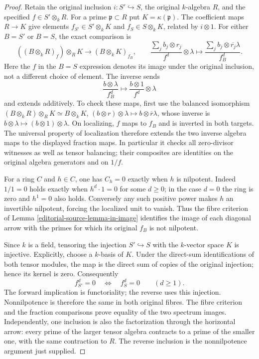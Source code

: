 \begin{proof}
Retain the original inclusion $i:S'\hookrightarrow S$,
the original $k$-algebra $R$, and the specified
$f\in S'\otimes_kR$. For a prime $\mathfrak p\subset R$
put $K=\kappa(\mathfrak p)$. The coefficient maps
$R\to K$ give elements $f_{S'}\in S'\otimes_kK$
and $f_S\in S\otimes_kK$, related by $i\otimes1$.
For either $B=S'$ or $B=S$, the exact comparison is
$$
((B\otimes_kR)_f)\otimes_RK
\longrightarrow (B\otimes_kK)_{f_B},
\qquad
\frac{\sum_j b_j\otimes r_j}{f^d}\otimes\lambda
\longmapsto
\frac{\sum_j b_j\otimes\overline{r_j}\lambda}{f_B^d}.
$$
Here the $f$ in the $B=S$ expression denotes its
image under the original inclusion, not a different
choice of element. The inverse sends
$$
\frac{b\otimes\lambda}{f_B^d}
\longmapsto \frac{b\otimes1}{f^d}\otimes\lambda
$$
and extends additively. To check these maps, first use
the balanced isomorphism
$(B\otimes_kR)\otimes_RK\simeq B\otimes_kK$,
$(b\otimes r)\otimes\lambda\mapsto b\otimes\overline r\lambda$,
whose inverse is $b\otimes\lambda\mapsto(b\otimes1)\otimes\lambda$.
On localizing, $f$ maps to $f_B$ and is inverted in
both targets. The universal property of localization
therefore extends the two inverse algebra maps to
the displayed fraction maps. In particular it checks
all zero-divisor witnesses as well as tensor balancing;
their composites are identities on the original
algebra generators and on $1/f$.

For a ring $C$ and $h\in C$, one has $C_h=0$
exactly when $h$ is nilpotent. Indeed $1/1=0$
holds exactly when $h^d\cdot1=0$ for some
$d\geq0$; in the case $d=0$ the ring is zero
and $h^1=0$ also holds. Conversely any such positive
power makes $h$ an invertible nilpotent, forcing the
localized unit to vanish. Thus the fibre criterion
of Lemma \ref{editorial-source-lemma-in-image} identifies the image
of each diagonal arrow with the primes for which
its original $f_B$ is not nilpotent.

Since $k$ is a field, tensoring the injection
$S'\hookrightarrow S$ with the $k$-vector space $K$
is injective. Explicitly, choose a $k$-basis of $K$.
Under the direct-sum identifications of both tensor
modules, the map is the direct sum of copies of the
original injection; hence its kernel is zero.
Consequently
$$
f_{S'}^d=0\quad\Longleftrightarrow\quad f_S^d=0
\qquad(d\geq1).
$$
The forward implication is functoriality; the reverse
uses this injection. Nonnilpotence is therefore the
same in both original fibres. The fibre criterion
and the fraction comparisons prove equality of the
two spectrum images. Independently, one inclusion
is also the factorization through the horizontal
arrow: every prime of the larger tensor algebra
contracts to a prime of the smaller one, with the
same contraction to $R$. The reverse inclusion is
the nonnilpotence argument just supplied.


\end{proof}
